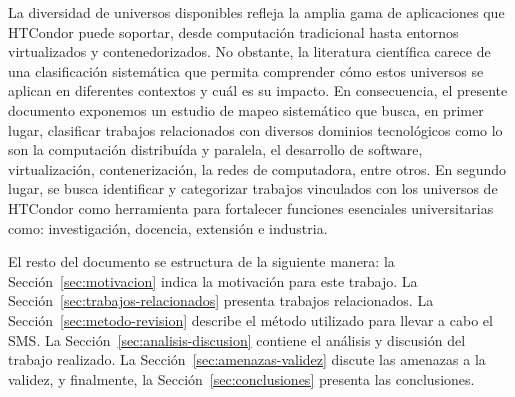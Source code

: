 La diversidad de universos disponibles refleja la amplia gama de aplicaciones
que HTCondor puede soportar, desde computación tradicional hasta entornos
virtualizados y contenedorizados. No obstante, la literatura científica carece
de una clasificación sistemática que permita comprender cómo estos universos
se aplican en diferentes contextos y cuál es su impacto. En consecuencia,
el presente documento exponemos un estudio de mapeo sistemático que busca,
en primer lugar, clasificar trabajos relacionados con diversos dominios tecnológicos
como lo son la computación distribuída y paralela, el desarrollo de software,
virtualización, contenerización, la redes de computadora, entre otros. En segundo lugar,
se busca identificar y categorizar trabajos vinculados con los universos de
HTCondor como herramienta para fortalecer funciones esenciales universitarias
como: investigación, docencia, extensión e industria.

El resto del documento se estructura de la siguiente manera:
la Sección~\ref{sec:motivacion} indica la motivación para este trabajo.
La Sección~\ref{sec:trabajos-relacionados} presenta trabajos relacionados.
La Sección~\ref{sec:metodo-revision} describe el método utilizado para llevar a cabo el SMS.
La Sección~\ref{sec:analisis-discusion} contiene el análisis y discusión del trabajo realizado.
La Sección~\ref{sec:amenazas-validez} discute las amenazas a la validez, y finalmente,
la Sección~\ref{sec:conclusiones} presenta las conclusiones.